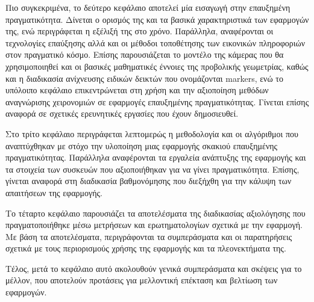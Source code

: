 Πιο συγκεκριμένα, το δεύτερο κεφάλαιο αποτελεί μία εισαγωγή στην επαυξημένη πραγματικότητα. Δίνεται ο ορισμός της και τα βασικά χαρακτηριστικά των εφαρμογών της, ενώ περιγράφεται η εξέλιξή της στο χρόνο. Παράλληλα, αναφέρονται οι τεχνολογίες επαύξησης αλλά και οι μέθοδοι τοποθέτησης των εικονικών πληροφοριών στον πραγματικό κόσμο. Επίσης παρουσιάζεται το μοντέλο της κάμερας που θα χρησιμοποιηθεί και οι βασικές μαθηματικές έννοιες της προβολικής γεωμετρίας, καθώς και η διαδικασία ανίχνευσης ειδικών δεικτών που ονομάζονται markers, ενώ το υπόλοιπο κεφάλαιο επικεντρώνεται στη χρήση και την αξιοποίηση μεθόδων αναγνώρισης χειρονομιών σε εφαρμογές επαυξημένης πραγματικότητας. Γίνεται επίσης αναφορά σε σχετικές ερευνητικές εργασίες που έχουν δημοσιευθεί.


Στο τρίτο κεφάλαιο περιγράφεται λεπτομερώς η μεθοδολογία και οι αλγόριθμοι που αναπτύχθηκαν με στόχο την υλοποίηση μιας εφαρμογής σκακιού επαυξημένης πραγματικότητας. Παράλληλα αναφέρονται τα εργαλεία ανάπτυξης της εφαρμογής και τα στοιχεία των συσκευών που αξιοποιήθηκαν για να γίνει πραγματικότητα. Επίσης, γίνεται αναφορά στη διαδικασία βαθμονόμησης που διεξήχθη για την κάλυψη των απαιτήσεων της εφαρμογής.


Το τέταρτο κεφάλαιο παρουσιάζει τα αποτελέσματα της διαδικασίας αξιολόγησης που πραγματοποιήθηκε μέσω μετρήσεων και ερωτηματολογίων σχετικά με την εφαρμογή. Με βάση τα αποτελέσματα, περιγράφονται τα συμπεράσματα και οι παρατηρήσεις σχετικά με τους περιορισμούς χρήσης της εφαρμογής και τα πλεονεκτήματα της.



Τέλος, μετά το κεφάλαιο αυτό ακολουθούν γενικά συμπεράσματα και σκέψεις για το μέλλον, που αποτελούν προτάσεις για μελλοντική επέκταση και βελτίωση των εφαρμογών.




